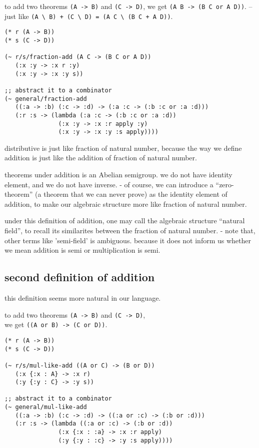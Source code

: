 \documentclass{sigplanconf}
\begin{document}
to add two theorems {\scriptsize\verb|(A -> B)|} and {\scriptsize\verb|(C -> D)|},
we get {\scriptsize\verb|(A B -> (B C or A D))|}.
-- just like {\scriptsize\verb|(A \ B) + (C \ D) = (A C \ (B C + A D))|}.

{\scriptsize\begin{verbatim}
(* r (A -> B))
(* s (C -> D))

(~ r/s/fraction-add (A C -> (B C or A D))
   (:x :y -> :x r :y)
   (:x :y -> :x :y s))

;; abstract it to a combinator
(~ general/fraction-add
   ((:a -> :b) (:c -> :d) -> (:a :c -> (:b :c or :a :d)))
   (:r :s -> (lambda (:a :c -> (:b :c or :a :d))
               (:x :y -> :x :r apply :y)
               (:x :y -> :x :y :s apply))))
\end{verbatim}}

distributive is just like fraction of natural number,
because the way we define addition
is just like the addition of fraction of natural number.

theorems under addition is an Abelian semigroup.
we do not have identity element,
and we do not have inverse.
- of course, we can introduce a ``zero-theorem''
  (a theorem that we can never prove)
  as the identity element of addition,
  to make our algebraic structure more like fraction of natural number.

under this definition of addition,
one may call the algebraic structure ``natural field'',
to recall its similarites between the fraction of natural number.
- note that,
  other terms like 'semi-field' is ambiguous.
  because it does not inform us
  whether we mean addition is semi or multiplication is semi.

\subsection{second definition of addition}

this definition seems more natural in our language.

to add two theorems {\scriptsize\verb|(A -> B)|} and {\scriptsize\verb|(C -> D)|}, \\
we get {\scriptsize\verb|((A or B) -> (C or D))|}.

{\scriptsize\begin{verbatim}
(* r (A -> B))
(* s (C -> D))

(~ r/s/mul-like-add ((A or C) -> (B or D))
   (:x {:x : A} -> :x r)
   (:y {:y : C} -> :y s))

;; abstract it to a combinator
(~ general/mul-like-add
   ((:a -> :b) (:c -> :d) -> ((:a or :c) -> (:b or :d)))
   (:r :s -> (lambda ((:a or :c) -> (:b or :d))
               (:x {:x : :a} -> :x :r apply)
               (:y {:y : :c} -> :y :s apply))))
\end{verbatim}}
\end{document}
